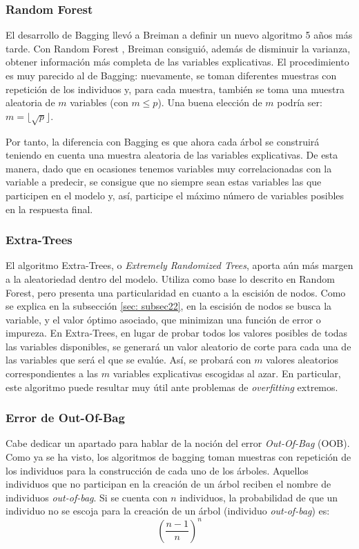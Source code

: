 \documentclass[12pt,twoside]{article}
\begin{document}
\subsubsection{Random Forest}
El desarrollo de Bagging llevó a Breiman a definir un nuevo algoritmo 5 años más tarde. Con Random Forest \cite{BR02}, Breiman consiguió, además de disminuir la varianza, obtener información más completa de las variables explicativas. El procedimiento es muy parecido al de Bagging: nuevamente, se toman diferentes muestras con repetición de los individuos y, para cada muestra, también se toma una muestra aleatoria de $m$ variables (con $m \leq p$). Una buena elección de $m$ podría ser: $ m = \lfloor \sqrt{p} \rfloor$.

Por tanto, la diferencia con Bagging es que ahora cada árbol se construirá teniendo en cuenta una muestra aleatoria de las variables explicativas. De esta manera, dado que en ocasiones tenemos variables muy correlacionadas con la variable a predecir, se consigue que no siempre sean estas variables las que participen en el modelo y, así, participe el máximo número de variables posibles en la respuesta final.


\subsubsection{Extra-Trees} \label{sec:ExtraTrees}
El algoritmo Extra-Trees, o \textit{Extremely Randomized Trees}, aporta aún más margen a la aleatoriedad dentro del modelo. Utiliza como base lo descrito en Random Forest, pero presenta una particularidad en cuanto a la escisión de nodos. Como se explica en la subsección \ref{sec: subsec22}, en la escisión de nodos se busca la variable, y el valor óptimo asociado, que minimizan una función de error o impureza. En Extra-Trees, en lugar de probar todos los valores posibles de todas las variables disponibles, se generará un valor aleatorio de corte para cada una de las variables que será el que se evalúe. Así, se probará con $m$ valores aleatorios correspondientes a las $m$ variables explicativas escogidas al azar. En particular, este algoritmo puede resultar muy útil ante problemas de \textit{overfitting} extremos.


\subsubsection{Error de Out-Of-Bag}
Cabe dedicar un apartado para hablar de la noción del error \textit{Out-Of-Bag} (OOB). Como ya se ha visto, los algoritmos de bagging toman muestras con repetición de los individuos para la construcción de cada uno de los árboles. Aquellos individuos que no participan en la creación de un árbol reciben el nombre de individuos \textit{out-of-bag}. Si se cuenta con $n$ individuos, la probabilidad de que un individuo no se escoja para la creación de un árbol (individuo \textit{out-of-bag}) es:
\begin{equation*}
\left( \frac{n-1}{n} \right)^n
\end{equation*}
\end{document}
